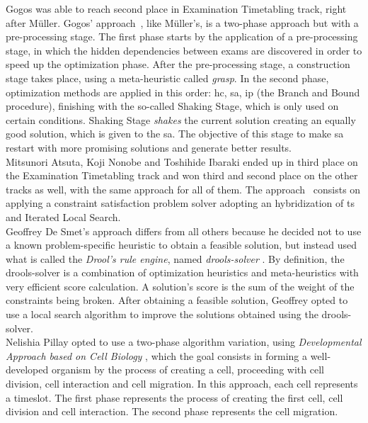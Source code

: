 Gogos was able to reach second place in Examination Timetabling track, right after M\"{u}ller. Gogos' approach~\cite{Gogos2012}, like M\"{u}ller's, is a two-phase approach but with a pre-processing stage. The first phase starts by the application of a pre-processing stage, in which the hidden dependencies between exams are discovered in order to speed up the optimization phase. After the pre-processing stage, a construction stage takes place, using a meta-heuristic called \textit{\gls{grasp}}. In the second phase, optimization methods are applied in this order: \gls{hc}, \gls{sa}, \gls{ip} (the Branch and Bound procedure), finishing with the so-called Shaking Stage, which is only used on certain conditions. Shaking Stage \textit{shakes} the current solution creating an equally good solution, which is given to the \gls{sa}. The objective of this stage to make \gls{sa} restart with more promising solutions and generate better results.\\

Mitsunori Atsuta, Koji Nonobe and Toshihide Ibaraki ended up in third place on the Examination Timetabling track and won third and second place on the other tracks as well, with the same approach for all of them. The approach~\cite{Atsuta2007} consists on applying a constraint satisfaction problem solver adopting an hybridization of \gls{ts} and Iterated Local Search.\\

Geoffrey De Smet's approach \cite{Smet2007} differs from all others because he decided not to use a known problem-specific heuristic to obtain a feasible solution, but instead used what is called the \textit{Drool's rule engine}, named \textit{drools-solver} \cite{Drools}. By definition, the drools-solver is a combination of optimization heuristics and meta-heuristics with very efficient score calculation. A solution's score is the sum of the weight of the constraints being broken. After obtaining a feasible solution, Geoffrey opted to use a local search algorithm to improve the solutions obtained using the drools-solver.\\

Nelishia Pillay opted to use a two-phase algorithm variation, using \textit{Developmental Approach based on Cell Biology} \cite{Pillay2007}, which the goal consists in forming a well-developed organism by the process of creating a cell, proceeding with cell division, cell interaction and cell migration. In this approach, each cell represents a timeslot. The first phase represents the process of creating the first cell, cell division and cell interaction. The second phase represents the cell migration.

